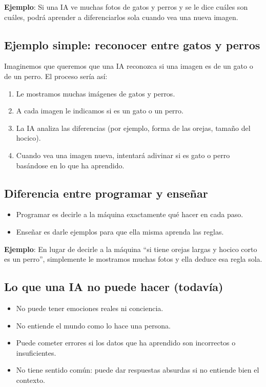 \documentclass[12pt]{article}
\begin{document}
	\textbf{Ejemplo}: Si una IA ve muchas fotos de gatos y perros y se le dice cuáles son cuáles, podrá aprender a diferenciarlos sola cuando vea una nueva imagen.
	
	\subsection*{Ejemplo simple: reconocer entre gatos y perros}
	Imaginemos que queremos que una IA reconozca si una imagen es de un gato o de un perro. El proceso sería así:
	\begin{enumerate}
		\item Le mostramos muchas imágenes de gatos y perros.
		\item A cada imagen le indicamos si es un gato o un perro.
		\item La IA analiza las diferencias (por ejemplo, forma de las orejas, tamaño del hocico).
		\item Cuando vea una imagen nueva, intentará adivinar si es gato o perro basándose en lo que ha aprendido.
	\end{enumerate}
	
	\subsection*{Diferencia entre programar y enseñar}
	\begin{itemize}
		\item Programar es decirle a la máquina exactamente qué hacer en cada paso.
		\item Enseñar es darle ejemplos para que ella misma aprenda las reglas.
	\end{itemize}
	
	\textbf{Ejemplo}: En lugar de decirle a la máquina “si tiene orejas largas y hocico corto es un perro”, simplemente le mostramos muchas fotos y ella deduce esa regla sola.
	
	\subsection*{Lo que una IA no puede hacer (todavía)}
	\begin{itemize}
		\item No puede tener emociones reales ni conciencia.
		\item No entiende el mundo como lo hace una persona.
		\item Puede cometer errores si los datos que ha aprendido son incorrectos o insuficientes.
		\item No tiene sentido común: puede dar respuestas absurdas si no entiende bien el contexto.
	\end{itemize}
	
\end{document}
